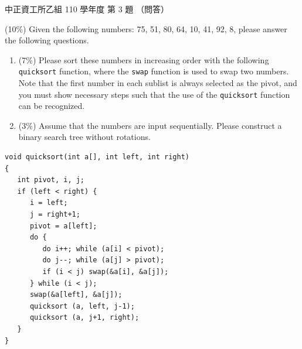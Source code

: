 \begin{pastexam}[label={px:ccu-110-csb-03}]{中正資工所乙組 110 學年度 第 3 題}
（問答）

(10\%) Given the following numbers: 75, 51, 80, 64, 10, 41, 92, 8, please answer the following
questions.
\begin{enumerate}[label=(\alph*)]
\item (7\%) Please sort these numbers in increasing order with the following \texttt{quicksort}
function, where the \texttt{swap} function is used to swap two numbers. Note that the first number
in each sublist is always selected as the pivot, and you must show necessary steps such that the
use of the \texttt{quicksort} function can be recognized.
\item (3\%) Assume that the numbers are input sequentially. Please construct a binary search tree
without rotations.
\end{enumerate}
\begin{verbatim}
void quicksort(int a[], int left, int right)
{
   int pivot, i, j;
   if (left < right) {
      i = left;
      j = right+1;
      pivot = a[left];
      do {
         do i++; while (a[i] < pivot);
         do j--; while (a[j] > pivot);
         if (i < j) swap(&a[i], &a[j]);
      } while (i < j);
      swap(&a[left], &a[j]);
      quicksort (a, left, j-1);
      quicksort (a, j+1, right);
   }
}
\end{verbatim}
\end{pastexam}

